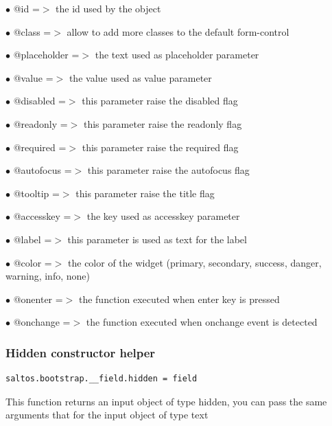 \documentclass[a4paper]{article}
\begin{document}
\begin{compactitem}
\item[\color{myblue}$\bullet$] @id          =$>$ the id used by the object
\item[\color{myblue}$\bullet$] @class       =$>$ allow to add more classes to the default form-control
\item[\color{myblue}$\bullet$] @placeholder =$>$ the text used as placeholder parameter
\item[\color{myblue}$\bullet$] @value       =$>$ the value used as value parameter
\item[\color{myblue}$\bullet$] @disabled    =$>$ this parameter raise the disabled flag
\item[\color{myblue}$\bullet$] @readonly    =$>$ this parameter raise the readonly flag
\item[\color{myblue}$\bullet$] @required    =$>$ this parameter raise the required flag
\item[\color{myblue}$\bullet$] @autofocus   =$>$ this parameter raise the autofocus flag
\item[\color{myblue}$\bullet$] @tooltip     =$>$ this parameter raise the title flag
\item[\color{myblue}$\bullet$] @accesskey   =$>$ the key used as accesskey parameter
\item[\color{myblue}$\bullet$] @label       =$>$ this parameter is used as text for the label
\item[\color{myblue}$\bullet$] @color       =$>$ the color of the widget (primary, secondary, success, danger, warning, info, none)
\item[\color{myblue}$\bullet$] @onenter     =$>$ the function executed when enter key is pressed
\item[\color{myblue}$\bullet$] @onchange    =$>$ the function executed when onchange event is detected
\end{compactitem}

\hypertarget{toc51}{}
\subsubsection{Hidden constructor helper}

\begin{lstlisting}
saltos.bootstrap.__field.hidden = field
\end{lstlisting}

This function returns an input object of type hidden, you can pass the same arguments
that for the input object of type text
\end{document}
